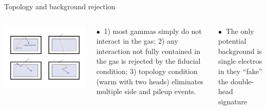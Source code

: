 \documentclass [aspectratio=169]{beamer}
\begin{document}
\begin{frame}{Topology and background rejection}

\begin{columns}
\includegraphics[scale=0.25]{geom_rejection.png}


$\bullet~$ 1) most gammas simply do not interact in the gas; 2) any interaction not fully contained in the gas is rejected by the fiducial condition; 3) topology condition (warm with two heads) eliminates multiple side and pileup events. 

$\bullet~$ The only potential background is single electros in they ``fake'' the double-head signature 

\end{columns}
\end{frame}
\end{document}
